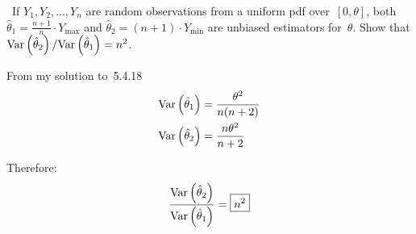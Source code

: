 \begin{problem}
  ~If ${Y_1,Y_2,\ldots,Y_n}$ are random observations from a uniform pdf over~${[0,\theta]}$, both ${\hat{\theta}_1 = \frac{n+1}{n} \cdot Y_{\max}}$ and ${\hat{\theta}_2 = (n+1) \cdot Y_{\min}}$ are unbiased estimators for~$\theta$.  Show that ${\text{Var}\left(\hat{\theta}_2\right) / \text{Var}\left(\hat{\theta}_1\right) = n^2}$.
\end{problem}

From my solution to~5.4.18
\begin{align}
  \text{Var}\left(\hat{\theta}_1\right) &= \frac{\theta^{2}}{n(n+2)}\\
  \text{Var}\left(\hat{\theta}_2\right) &= \frac{n\theta^{2}}{n+2}
\end{align}

Therefore:
\begin{equation}
  \frac{\text{Var}\left(\hat{\theta}_2\right)}{\text{Var}\left(\hat{\theta}_1\right)} = \boxed{n^2}
\end{equation}
